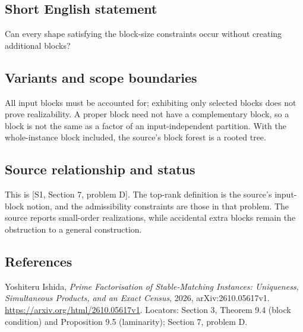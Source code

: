 \documentclass[11pt,a4paper]{article}
\begin{document}
\subsection*{Short English statement}
Can every shape satisfying the block-size constraints occur without
creating additional blocks?

\subsection*{Variants and scope boundaries}
All input blocks must be accounted for; exhibiting only selected blocks
does not prove realizability. A proper block need not have a complementary
block, so a block is not the same as a factor of an input-independent
partition. With the whole-instance block included, the source's
block forest is a rooted tree.

\subsection*{Source relationship and status}
This is [S1, Section 7, problem D]. The top-rank definition is the
source's input-block notion, and the admissibility constraints are those
in that problem. The source reports small-order realizations, while
accidental extra blocks remain the obstruction to a general construction.

\subsection*{References}
\begingroup\footnotesize\raggedright
\noindent[S1] Yoshiteru Ishida,
\emph{Prime Factorisation of Stable-Matching Instances: Uniqueness,
Simultaneous Products, and an Exact Census}, 2026,
arXiv:2610.05617v1.
\url{https://arxiv.org/html/2610.05617v1}.
Locators: Section 3, Theorem 9.4 (block condition) and
Proposition 9.5 (laminarity); Section 7, problem D.



\par\endgroup
\end{document}
